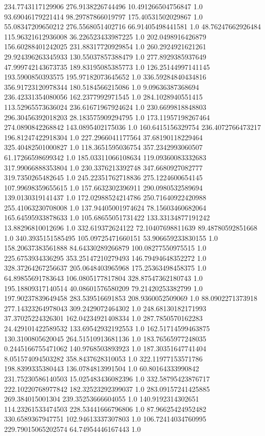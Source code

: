 234.7743117129906	276.9138226744496	10.491266504756847	1.0
93.69046179221414	98.29787866019797	175.40531502029867	1.0
55.08347209650212	276.5568051402716	66.91405498441581	1.0
48.76247662926484	115.96321612936008	36.226523433987225	1.0
202.0498916426879	156.60288401242025	231.88317720929854	1.0
260.2924921621261	29.924396263345933	130.55037857388479	1.0
277.8929385937649	47.999742143673735	189.83195085385773	1.0
126.25144997141145	193.5900850393575	195.97182073645652	1.0
336.59284840434816	356.91723120978344	180.5184566215086	1.0
9.09636387368694	236.42331354080056	162.2377992971545	1.0
284.1028940551415	113.52965573636024	236.61671967924624	1.0
230.6699818848803	296.30456392018203	28.183575909294795	1.0
173.11957198267464	274.0890842268842	143.0895402175036	1.0
160.6415156329754	236.4072766473217	196.81247422918304	1.0
227.2966041177564	37.68190118229464	325.40482501000827	1.0
118.3651595036754	357.2342993060507	61.17266598699342	1.0
185.03311066108634	119.09360083332683	317.99066888353804	1.0
230.3376213392748	347.6680927082777	319.7350265482645	1.0
245.22351762718836	275.1224600654145	107.99698359655615	1.0
157.6632302396911	290.0980532589694	139.0130319141437	1.0
172.02988524214786	250.71640922420988	255.41063230708008	1.0
137.94405001974624	78.15603460682064	165.64595933878633	1.0
105.68655051731422	133.33134877191242	13.88296810012696	1.0
332.619372624122	72.10407698811639	89.48780592851668	1.0
340.3935151585495	105.09725471660151	53.906659233830155	1.0
158.20637383561888	84.64330289266879	100.08277550975515	1.0
225.6753934336295	353.25147210279493	146.79494648352272	1.0
328.37264267256637	205.0648403965968	175.25363498458375	1.0
64.89855691783643	106.0805177817804	328.87547362180743	1.0
195.18809317140514	40.08601576580209	79.21420253382799	1.0
197.90237839649458	283.539516691853	208.9360052509069	1.0
88.0902271373918	277.14323264978043	309.2429072464302	1.0
248.68130182171993	37.37025224326301	162.04234921408334	1.0
287.7850570162283	24.429101422589532	133.69542932192553	1.0
162.51714599463875	130.3100805620045	264.51510913681136	1.0
183.76565977248035	0.2445166755471062	140.9768503893923	1.0
187.30351647741404	8.051574094503282	358.8437628310053	1.0
322.11977153571786	198.8399335380443	136.0784813991504	1.0
60.80164333990842	231.75230586140503	15.025483436082396	1.0
332.58795423876717	222.10220768977842	182.32523292399037	1.0
283.09157241425885	269.384015001304	239.35253666604055	1.0
140.9192314302651	114.23261533474503	228.53441666796806	1.0
87.96625424952482	330.6589367947751	102.94613337307803	1.0
106.72414034760995	229.79015065202574	64.74954446167443	1.0
